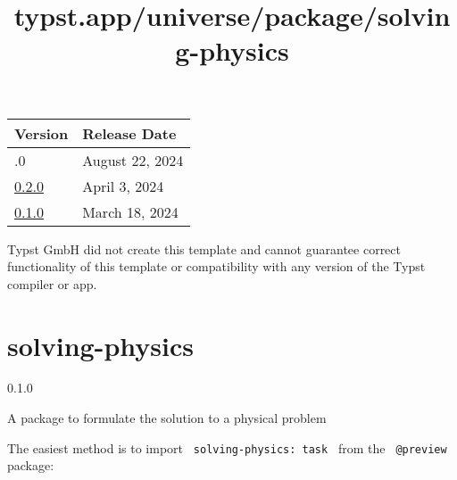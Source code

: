 \begin{longtable}[]{@{}ll@{}}
\toprule\noalign{}
Version & Release Date \\
\midrule\noalign{}
\endhead
\bottomrule\noalign{}
\endlastfoot
0.3.0 & August 22, 2024 \\
\href{https://typst.app/universe/package/cumcm-muban/0.2.0/}{0.2.0} &
April 3, 2024 \\
\href{https://typst.app/universe/package/cumcm-muban/0.1.0/}{0.1.0} &
March 18, 2024 \\
\end{longtable}

Typst GmbH did not create this template and cannot guarantee correct
functionality of this template or compatibility with any version of the
Typst compiler or app.


\title{typst.app/universe/package/solving-physics}

\label{banner}
\section{solving-physics}\label{solving-physics}

{ 0.1.0 }

A package to formulate the solution to a physical problem

\label{readme}
The easiest method is to import \texttt{\ solving-physics:\ task\ } from
the \texttt{\ @preview\ } package:

\begin{Shaded}
\begin{Highlighting}[]
\end{Highlighting}
\end{Shaded}

\begin{Shaded}
\begin{Highlighting}[]
\NormalTok{  given: [}
\NormalTok{  ],}
\NormalTok{  find: [}
\NormalTok{  ],}
\NormalTok{)[}
\NormalTok{]}
\end{Highlighting}
\end{Shaded}


